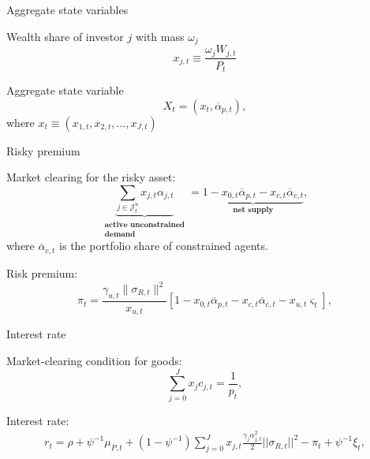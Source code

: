 \begin{frame}{Aggregate state variables}
	\begin{wideitemize}
		\item Wealth share of investor $j$ with mass $ \omega_j $
		\[x_{j, t} \equiv \frac{\omega_{j} W_{j, t}}{P_{t}}\]
		\item Aggregate state variable 
		\[X_{t}=\left(x_{t}, \overline{\alpha}_{p, t}\right),\]
		where $x_{t} \equiv\left(x_{1, t}, x_{2, t}, \ldots, x_{J, t}\right)$
	\end{wideitemize}
\end{frame}

\begin{frame}{Risky premium}
\begin{wideitemize}
	\item Market clearing for the risky asset:
	\begin{equation}
		\underbrace{\sum_{j \in \mathcal{J}_t^u} x_{j,t} \alpha_{j,t} }_{\substack{\textbf{active unconstrained}\\
				\textbf{demand}}} = \underbrace{1 - x_{0,t} \overline{\alpha}_{p,t} - x_{c,t} \overline{\alpha}_{c,t} }_{\textbf{net supply}},\nonumber
	\end{equation}\footnotesize
	where $\overline{\alpha}_{c,t} $ is the portfolio share of constrained agents. \normalsize  \vspM \pause
	
		\item Risk premium:
		\begin{equation}\label{eq:sharpe_ratio}
			\pi_{t} =  \frac{\gamma_{u,t} \|\sigma_{R,t}\|^2}{x_{u,t}} \left[ 1 - x_{0,t} \overline{\alpha}_{p,t} - x_{c,t} \overline{\alpha}_{c,t} - x_{u,t} \varsigma_{t} \right] ,\nonumber
		\end{equation}\footnotesize
\end{wideitemize}
\end{frame}

\begin{frame}{Interest rate}
	\begin{wideitemize}
		\item Market-clearing condition for goods:
		\begin{equation}
			\sum_{j=0}^J x_j c_{j,t} = \frac{1}{p_t}, \nonumber
		\end{equation}
	
	\item Interest rate:
	\begin{align}\label{eq:interest_rate}
		r_t  =  \rho  +\psi^{-1} \mu_{P,t} + \left (1-\psi^{-1}\right )  \sum_{j=0}^J x_{j,t}\frac{\gamma_j \alpha_{j,t}^2}{2} ||\sigma_{R,t}||^2- \pi_t +\psi^{-1} \xi_t,\nonumber
	\end{align}
	\end{wideitemize}
\end{frame}

